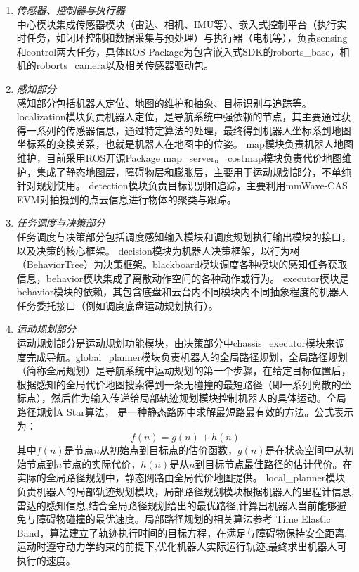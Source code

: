\documentclass[lang=cn,11pt,a4paper]{elegantpaper}
\begin{document}
\begin{enumerate}[label=\arabic*).]
  \item \textit{传感器、控制器与执行器}\\
      中心模块集成传感器模块（雷达、相机、IMU等）、嵌入式控制平台（执行实时任务，如闭环控制和数据采集与预处理）与执行器（电机等），负责sensing和control两大任务，具体ROS Package为包含嵌入式SDK的roborts\_base，相机的roborts\_camera以及相关传感器驱动包。
  \item \textit{感知部分}\\
      感知部分包括机器人定位、地图的维护和抽象、目标识别与追踪等。localization模块负责机器人定位，是导航系统中强依赖的节点，其主要通过获得一系列的传感器信息，通过特定算法的处理，最终得到机器人坐标系到地图坐标系的变换关系，也就是机器人在地图中的位姿。
      map模块负责机器人地图维护，目前采用ROS开源Package map\_server。
      costmap模块负责代价地图维护，集成了静态地图层，障碍物层和膨胀层，主要用于运动规划部分，不单纯针对规划使用。
      detection模块负责目标识别和追踪，主要利用mmWave-CAS EVM对拍摄到的点云信息进行物体的聚类与跟踪。
  \item \textit{任务调度与决策部分}\\
  任务调度与决策部分包括调度感知输入模块和调度规划执行输出模块的接口，以及决策的核心框架。
  decision模块为机器人决策框架，以行为树（BehaviorTree）为决策框架。blackboard模块调度各种模块的感知任务获取信息，behavior模块集成了离散动作空间的各种动作或行为。
  executor模块是behavior模块的依赖，其包含底盘和云台内不同模块内不同抽象程度的机器人任务委托接口（例如调度底盘运动规划执行）。
  \item \textit{运动规划部分}\\
  运动规划部分是运动规划功能模块，由决策部分中chassis\_executor模块来调度完成导航。global\_planner模块负责机器人的全局路径规划，全局路径规划（简称全局规划）是导航系统中运动规划的第一个步骤，在给定目标位置后，根据感知的全局代价地图搜索得到一条无碰撞的最短路径（即一系列离散的坐标点），然后作为输入传递给局部轨迹规划模块控制机器人的具体运动。全局路径规划A Star算法，
  是一种静态路网中求解最短路最有效的方法。公式表示为：
  $$
    f(n)=g(n)+h(n)
    \label{a*}
  $$
  其中$f(n)$是节点$n$从初始点到目标点的估价函数，$g(n)$是在状态空间中从初始节点到$n$节点的实际代价，$h(n)$是从$n$到目标节点最佳路径的估计代价。在实际的全局路径规划中，静态网路由全局代价地图提供。
  local\_planner模块负责机器人的局部轨迹规划模块，局部路径规划模块根据机器人的里程计信息,雷达的感知信息,结合全局路径规划给出的最优路径,计算出机器人当前能够避免与障碍物碰撞的最优速度。局部路径规划的相关算法参考 Time Elastic Band，算法建立了轨迹执行时间的目标方程，在满足与障碍物保持安全距离, 运动时遵守动力学约束的前提下,优化机器人实际运行轨迹,最终求出机器人可执行的速度。
\end{enumerate}
\end{document}
